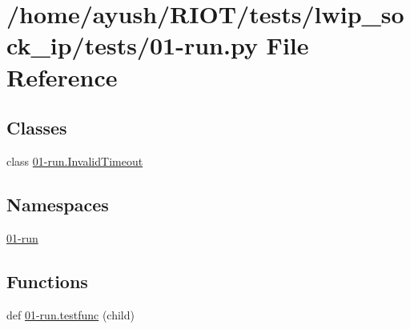 \hypertarget{lwip__sock__ip_2tests_201-run_8py}{}\section{/home/ayush/\+R\+I\+O\+T/tests/lwip\+\_\+sock\+\_\+ip/tests/01-\/run.py File Reference}
\label{lwip__sock__ip_2tests_201-run_8py}
\subsection*{Classes}
\begin{DoxyCompactItemize}
\item 
class \hyperlink{class01-run_1_1InvalidTimeout}{01-\/run.\+Invalid\+Timeout}
\end{DoxyCompactItemize}
\subsection*{Namespaces}
\begin{DoxyCompactItemize}
\item 
 \hyperlink{namespace01-run}{01-\/run}
\end{DoxyCompactItemize}
\subsection*{Functions}
\begin{DoxyCompactItemize}
\item 
def \hyperlink{namespace01-run_aff983ffd4ab0e6bf8e7e58970e4a10bb}{01-\/run.\+testfunc} (child)
\end{DoxyCompactItemize}
